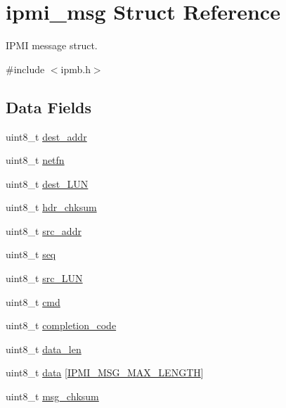 \hypertarget{structipmi__msg}{\section{ipmi\-\_\-msg Struct Reference}
\label{structipmi__msg}
}


I\-P\-M\-I message struct.  




{\ttfamily \#include $<$ipmb.\-h$>$}

\subsection*{Data Fields}
\begin{DoxyCompactItemize}
\item 
uint8\-\_\-t \hyperlink{structipmi__msg_ac2558cc703217e0716748389e27e761e}{dest\-\_\-addr}
\item 
uint8\-\_\-t \hyperlink{structipmi__msg_a47f4c1948609eff0cb5e3e86523118aa}{netfn}
\item 
uint8\-\_\-t \hyperlink{structipmi__msg_a224663171803faefb5826aec006cf143}{dest\-\_\-\-L\-U\-N}
\item 
uint8\-\_\-t \hyperlink{structipmi__msg_acaee5f5293078d1253b08371547b640d}{hdr\-\_\-chksum}
\item 
uint8\-\_\-t \hyperlink{structipmi__msg_a1d76593e504bafe00e55dacbe5ac719b}{src\-\_\-addr}
\item 
uint8\-\_\-t \hyperlink{structipmi__msg_a5a0a03acb296bfb8fcaa13af34d6753d}{seq}
\item 
uint8\-\_\-t \hyperlink{structipmi__msg_af532820e2b3f8a729c4546bd7af7a2c0}{src\-\_\-\-L\-U\-N}
\item 
uint8\-\_\-t \hyperlink{structipmi__msg_ac61985f05387f5e23043c569903cc234}{cmd}
\item 
uint8\-\_\-t \hyperlink{structipmi__msg_ab231f756803561da0a67de90703df5a7}{completion\-\_\-code}
\item 
uint8\-\_\-t \hyperlink{structipmi__msg_ab45a4f31a5fb3c2e3f7d0300984c75fc}{data\-\_\-len}
\item 
uint8\-\_\-t \hyperlink{structipmi__msg_a1151a6e64b5aed9d45abf0a92177a3fd}{data} \mbox{[}\hyperlink{ipmb_8h_a8e082d155fb84055bdbec5d79c79ae40}{I\-P\-M\-I\-\_\-\-M\-S\-G\-\_\-\-M\-A\-X\-\_\-\-L\-E\-N\-G\-T\-H}\mbox{]}
\item 
uint8\-\_\-t \hyperlink{structipmi__msg_ad51dafec9dccf98423ec918685c865b4}{msg\-\_\-chksum}
\end{DoxyCompactItemize}


